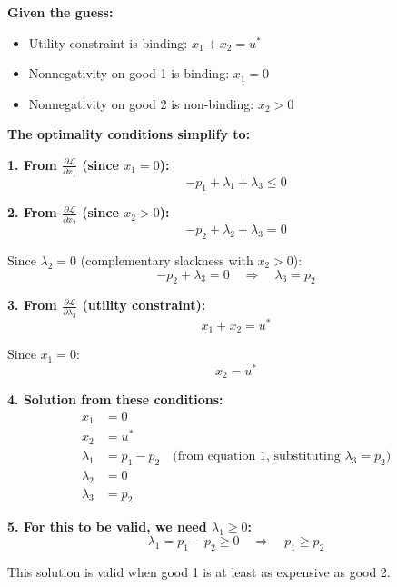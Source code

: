 \documentclass[11pt]{article}
\begin{document}
\begin{tcolorbox}[colback=yellow!10!white,colframe=orange!75!black,title=Problem 2b Answer]

\textbf{Given the guess:}
\begin{itemize}
\item Utility constraint is binding: $x_1 + x_2 = u^*$
\item Nonnegativity on good 1 is binding: $x_1 = 0$
\item Nonnegativity on good 2 is non-binding: $x_2 > 0$
\end{itemize}

\textbf{The optimality conditions simplify to:}

\textbf{1. From $\frac{\partial \mathcal{L}}{\partial x_1}$ (since $x_1 = 0$):}
\begin{equation}
-p_1 + \lambda_1 + \lambda_3 \leq 0
\end{equation}

\textbf{2. From $\frac{\partial \mathcal{L}}{\partial x_2}$ (since $x_2 > 0$):}
\begin{equation}
-p_2 + \lambda_2 + \lambda_3 = 0
\end{equation}

Since $\lambda_2 = 0$ (complementary slackness with $x_2 > 0$):
\begin{equation}
-p_2 + \lambda_3 = 0 \quad \Rightarrow \quad \lambda_3 = p_2
\end{equation}

\textbf{3. From $\frac{\partial \mathcal{L}}{\partial \lambda_3}$ (utility constraint):}
\begin{equation}
x_1 + x_2 = u^*
\end{equation}

Since $x_1 = 0$:
\begin{equation}
x_2 = u^*
\end{equation}

\textbf{4. Solution from these conditions:}
\begin{align}
x_1 &= 0 \\
x_2 &= u^* \\
\lambda_1 &= p_1 - p_2 \quad \text{(from equation 1, substituting $\lambda_3 = p_2$)} \\
\lambda_2 &= 0 \\
\lambda_3 &= p_2
\end{align}

\textbf{5. For this to be valid, we need $\lambda_1 \geq 0$:}
\begin{equation}
\lambda_1 = p_1 - p_2 \geq 0 \quad \Rightarrow \quad p_1 \geq p_2
\end{equation}

This solution is valid when good 1 is at least as expensive as good 2.

\end{tcolorbox}
\end{document}
